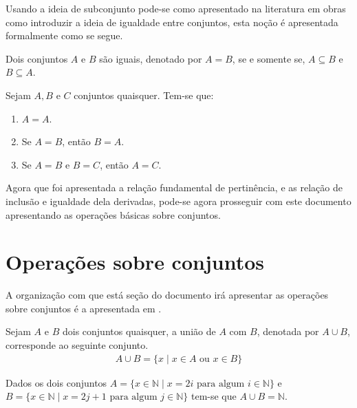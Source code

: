 Usando a ideia de subconjunto pode-se como apresentado na literatura em obras como \cite{abe1991-TC, halmos2001, lipschutz1978-TC} introduzir a ideia de igualdade entre conjuntos, esta noção é apresentada formalmente como se segue.

\begin{definicao}\label{def:IgualdadeConjuntos}
  \cite{abe1991-TC} Dois conjuntos $A$ e $B$ são iguais, denotado por $A = B$, se e somente se, $A \subseteq B$ e $B \subseteq A$.
\end{definicao}

\begin{teorema}
	Sejam $A, B$ e $C$ conjuntos quaisquer. Tem-se que:
	\begin{enumerate}
		\item $A = A$.
		\item Se $A = B$, então $B = A$.
		\item Se $A = B$ e $B = C$, então $A = C$.
	\end{enumerate}
\end{teorema}

Agora que foi apresentada a relação fundamental de pertinência, e as relação de inclusão e igualdade dela derivadas, pode-se agora prosseguir com este documento apresentando as operações básicas sobre conjuntos.

\section{Operações sobre conjuntos}\label{sec:OperacaoSobreConjuntos}

A organização com que está seção do documento irá apresentar as operações sobre conjuntos é a apresentada em \cite{lipschutz2013-MD}.

\begin{definicao}\label{def:UniaoConjuntos}
  Sejam $A$ e $B$ dois conjuntos quaisquer, a união de $A$ com $B$, denotada por $A \cup B$, corresponde ao seguinte conjunto.
  \begin{eqnarray*}
    A \cup B = \{x \mid x \in A \mbox{ ou } x \in B\}
  \end{eqnarray*}
\end{definicao}

\begin{exemplo}\label{exe:UniaoConjuntos1}
  Dados os dois conjuntos $A = \{x \in \mathbb{N} \mid x = 2i \mbox{ para algum } i \in \mathbb{N}\}$ e $B = \{x \in \mathbb{N} \mid x = 2j + 1 \mbox{ para algum } j \in \mathbb{N}\}$ tem-se que $A \cup B = \mathbb{N}$.
\end{exemplo}

